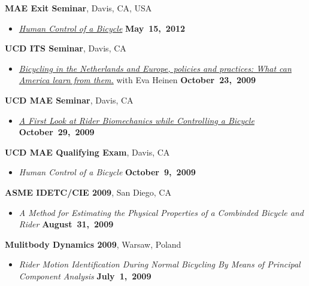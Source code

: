 \documentclass[10pt]{article}
\newenvironment{outerlist}[1][\enskip\textbullet]%
        {\begin{itemize}[#1]}{\end{itemize}%
         \vspace{-.6\baselineskip}}
\newenvironment{innerlist}[1][\enskip\textbullet]%
        {\begin{compactitem}[#1]}{\end{compactitem}}
\newcommand{\blankline}{\quad\pagebreak[2]}
\begin{document}
\begin{innerlist}
\blankline

\textbf{MAE Exit Seminar}, Davis, CA, USA
\begin{outerlist}
  \item[] \textit{\href{http://youtu.be/oKbaHCGK94E}{Human Control of a
    Bicycle}}
  \hfill \textbf{May~15,~2012}
\end{outerlist}

\blankline

\textbf{UCD ITS Seminar}, Davis, CA
\begin{outerlist}
\item[]
  \textit{\href{http://www.its.ucdavis.edu/?seminar=october-23-2009}{Bicycling
    in the Netherlands and Europe, policies and practices: What can America
    learn from them.}} with Eva Heinen
    \hfill \textbf{October~23,~2009}
\end{outerlist}

\blankline

\textbf{UCD MAE Seminar}, Davis, CA
\begin{outerlist}
  \item[]
    \textit{\href{http://archive.org/details/AFirstLookAtRiderBiomechanicsWhileControllingABicycle}{A
      First Look at Rider Biomechanics while Controlling a Bicycle}}
    \hfill \textbf{October~29,~2009}
\end{outerlist}

\blankline

\textbf{UCD MAE Qualifying Exam}, Davis, CA
\begin{outerlist}
  \item[] \textit{Human Control of a Bicycle}
    \hfill \textbf{October~9,~2009}
\end{outerlist}

\blankline

\textbf{ASME IDETC/CIE 2009}, San Diego, CA
\begin{outerlist}
  \item[] \textit{A Method for Estimating the Physical Properties of a Combinded Bicycle and
Rider}
    \hfill \textbf{August~31,~2009}
\end{outerlist}

\blankline

\textbf{Mulitbody Dynamics 2009}, Warsaw, Poland
\begin{outerlist}
  \item[] \textit{Rider Motion Identification During Normal Bicycling By Means of Principal
Component Analysis}
    \hfill \textbf{July~1,~2009}
\end{outerlist}


\end{innerlist}
\end{document}
